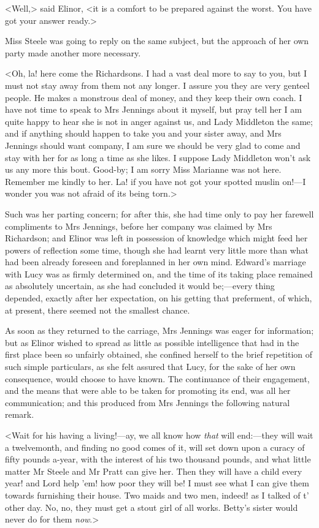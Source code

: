 <Well,> said Elinor, <it is a comfort to be prepared against the worst. You have got your answer ready.>

Miss Steele was going to reply on the same subject, but the approach of her own party made another more necessary.

<Oh, la! here come the Richardsons. I had a vast deal more to say to you, but I must not stay away from them not any longer. I assure you they are very genteel people. He makes a monstrous deal of money, and they keep their own coach. I have not time to speak to Mrs Jennings about it myself, but pray tell her I am quite happy to hear she is not in anger against us, and Lady Middleton the same; and if anything should happen to take you and your sister away, and Mrs Jennings should want company, I am sure we should be very glad to come and stay with her for as long a time as she likes. I suppose Lady Middleton won't ask us any more this bout. Good-by; I am sorry Miss Marianne was not here. Remember me kindly to her. La! if you have not got your spotted muslin on!—I wonder you was not afraid of its being torn.>

Such was her parting concern; for after this, she had time only to pay her farewell compliments to Mrs Jennings, before her company was claimed by Mrs Richardson; and Elinor was left in possession of knowledge which might feed her powers of reflection some time, though she had learnt very little more than what had been already foreseen and foreplanned in her own mind. Edward's marriage with Lucy was as firmly determined on, and the time of its taking place remained as absolutely uncertain, as she had concluded it would be;—every thing depended, exactly after her expectation, on his getting that preferment, of which, at present, there seemed not the smallest chance.

As soon as they returned to the carriage, Mrs Jennings was eager for information; but as Elinor wished to spread as little as possible intelligence that had in the first place been so unfairly obtained, she confined herself to the brief repetition of such simple particulars, as she felt assured that Lucy, for the sake of her own consequence, would choose to have known. The continuance of their engagement, and the means that were able to be taken for promoting its end, was all her communication; and this produced from Mrs Jennings the following natural remark.

<Wait for his having a living!—ay, we all know how \textit{that} will end:—they will wait a twelvemonth, and finding no good comes of it, will set down upon a curacy of fifty pounds a-year, with the interest of his two thousand pounds, and what little matter Mr Steele and Mr Pratt can give her. Then they will have a child every year! and Lord help 'em! how poor they will be! I must see what I can give them towards furnishing their house. Two maids and two men, indeed! as I talked of t' other day. No, no, they must get a stout girl of all works. Betty's sister would never do for them \textit{now}.>

